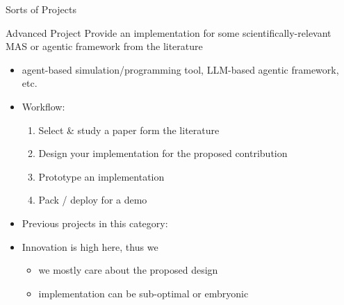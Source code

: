 \documentclass[presentation]{beamer}\mode<presentation>{\usetheme{AMSBolognaFC}}
\begin{document}
\begin{frame}[c, allowframebreaks]{Sorts of Projects}
    \begin{block}{Advanced \courseAcronym{} Project}
        Provide an implementation for some \alert{scientifically-relevant} MAS or agentic framework \alert{from the literature}
        \begin{itemize}
            \item[eg] agent-based simulation/programming tool, LLM-based agentic framework, etc.
            \item Workflow:
            \begin{enumerate}
				\item Select \& study a paper form the literature
				\item Design your implementation for the proposed contribution
				\item Prototype an implementation
				\item Pack / deploy for a demo
			\end{enumerate}
            \item Previous projects in this category: 
            \item[!] Innovation is high here, thus we
            \begin{itemize}
                \item we mostly care about the proposed design
                \item implementation can be sub-optimal or embryonic
            \end{itemize}
        \end{itemize}
    \end{block}


\end{frame}
\end{document}
